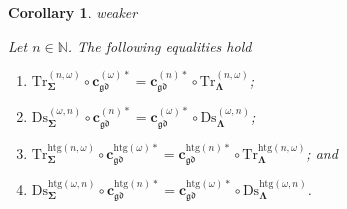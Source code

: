 \documentclass[a4paper, reqno]{amsbook}
\makeatletter
\newcommand{\sig}[1]{\mathbf{#1}}             %
\newcommand{\gd}{\mathfrak{gd}}              %
\newcommand{\htg}{\mathrm{htg}}                %
\newcommand{\Ds}{\mathrm{Ds}}
\newcommand{\Tr}{\mathrm{Tr}}
\theoremstyle{plain}
\newtheorem{corollary}[theorem]{Corollary}
\theoremstyle{definition}
\newcommand*{\CA@leanpending}{}
\newcommand*{\CA@leanrelation}{}
\newcommand*{\lean}[2]{%
  \ifcsname\string\color@lean@#1\endcsname\else
    \PackageError{main}{Unknown relation `#1' in \string\lean}{Use equivalent, weaker or stronger.}%
  \fi
  \gdef\CA@leanrelation{#1}%
  \gdef\CA@leanpending{#2}}
\makeatother
\begin{document}
\begin{corollary}\label{CChangeSigDsTrOmega}\lean{weaker}{ChangeOfSignature.homogeneousOmegaTruncationFunctorChange,ChangeOfSignature.homogeneousOmegaDiscretizationFunctorChange,ChangeOfSignature.heterogeneousOmegaTruncationFunctorChange,ChangeOfSignature.heterogeneousOmegaDiscretizationFunctorChange}
Let $n\in\mathbb{N}$.
The following equalities hold
\begin{enumerate}
	\item
	$\Tr^{(n,\omega)}_{\sig{\Sigma}}\circ\mathbf{c}^{(\omega)\ast}_{\gd}=\mathbf{c}^{(n)\ast}_{\gd}\circ\Tr^{(n,\omega)}_{\sig{\Lambda}}$;

	\item
	$\Ds^{(\omega,n)}_{\sig{\Sigma}}\circ\mathbf{c}^{(n)\ast}_{\gd}=\mathbf{c}^{(\omega)\ast}_{\gd}\circ\Ds^{(\omega,n)}_{\sig{\Lambda}}$;

	\item
	$\Tr^{\htg(n,\omega)}_{\sig{\Sigma}}\circ\mathbf{c}^{\htg(\omega)\ast}_{\gd}=\mathbf{c}^{\htg(n)\ast}_{\gd}\circ\Tr^{\htg(n,\omega)}_{\sig{\Lambda}}$; and

	\item
	$\Ds^{\htg(\omega,n)}_{\sig{\Sigma}}\circ\mathbf{c}^{\htg(n)\ast}_{\gd}=\mathbf{c}^{\htg(\omega)\ast}_{\gd}\circ\Ds^{\htg(\omega,n)}_{\sig{\Lambda}}$.
\end{enumerate}
\end{corollary}
\end{document}
